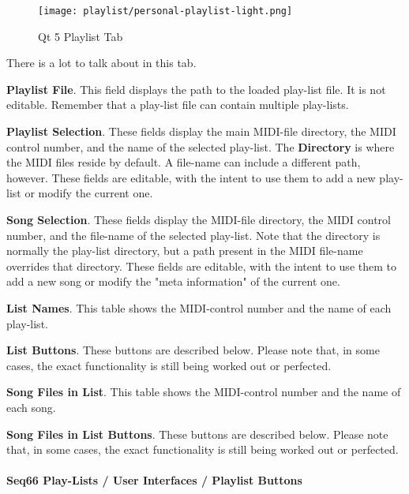 \begin{figure}[H]
   \centering 
   \texttt{[image: playlist/personal-playlist-light.png]}
   \caption*{Qt 5 Playlist Tab}
\end{figure}

   There is a lot to talk about in this tab.

   \begin{enumber}
      \item \textbf{Playlist File}.
         This field displays the path to the loaded
         play-list file.  It is not editable.  Remember that
         a play-list file can contain multiple play-lists.
      \item \textbf{Playlist Selection}.
         These fields display the main MIDI-file directory,
         the MIDI control number, and the name of the selected play-list.
         The \textbf{Directory} is where the MIDI files reside by default.
         A file-name can include a different path, however.
         These fields are editable, with the intent to use them to add a new
         play-list or modify the current one.
      \item \textbf{Song Selection}.
         These fields display the MIDI-file directory,
         the MIDI control number, and the file-name of the selected play-list.
         Note that the directory is normally the play-list directory, but a
         path present in the MIDI file-name overrides that directory.
         These fields are editable, with the intent to use them to add a new
         song or modify the "meta information" of the current one.
      \item \textbf{List Names}.
         This table shows the MIDI-control number and
         the name of each play-list.
      \item \textbf{List Buttons}.
         These buttons are described below.
         Please note that, in some cases, the exact functionality is still
         being worked out or perfected.
      \item \textbf{Song Files in List}.
         This table shows the MIDI-control number and
         the name of each song.
      \item \textbf{Song Files in List Buttons}.
         These buttons are described below.
         Please note that, in some cases, the exact functionality is still
         being worked out or perfected.
   \end{enumber}

\paragraph{Seq66 Play-Lists / User Interfaces / Playlist Buttons}
\label{paragraph:playlist_ui_qt_playlist_buttons}

